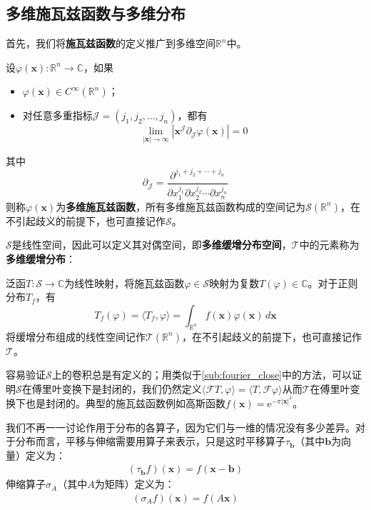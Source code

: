 \subsection{多维施瓦兹函数与多维分布}\label{sub:multi_schwartz}

首先，我们将\textbf{施瓦兹函数}的定义推广到多维空间$\mathbb{R}^n$中。
\begin{definition}[多维施瓦兹函数]
    设$\varphi(\mathbf{x}):\mathbb{R}^n\to\mathbb{C}$，如果\begin{itemize}
        \item $\varphi(\mathbf{x})\in C^{\infty}(\mathbb{R}^n)$；
        \item 对任意多重指标$\mathcal{J}=(j_1,j_2,\ldots,j_n)$，都有
        \[\lim_{|\mathbf{x}|\to\infty}|\mathbf{x}^{\mathcal{J}} \partial_{\mathcal{J}} \varphi(\mathbf{x})|=0\]
    \end{itemize}
    其中$$\partial_{\mathcal{J}}=\frac{\partial^{j_1+j_2+\cdots +j_n}}{\partial x_1^{j_1}\partial x_2^{j_2}\cdots \partial x_n^{j_n}}$$
    则称$\varphi(\mathbf{x})$为\textbf{多维施瓦兹函数}，所有多维施瓦兹函数构成的空间记为$\mathcal{S}(\mathbb{R}^n)$，在不引起歧义的前提下，也可直接记作$\mathcal{S}$。
\end{definition}

$\mathcal{S} $是线性空间，因此可以定义其对偶空间，即\textbf{多维缓增分布空间}，$\mathcal{T} $中的元素称为\textbf{多维缓增分布}：
\begin{definition}[多维缓增分布]
    泛函$T:\mathcal{S} \to \mathbb{C}$为线性映射，将施瓦兹函数$\varphi\in \mathcal{S} $映射为复数$T(\varphi)\in \mathbb{C}$。对于正则分布$T_f$，有
    $$T_f(\varphi)=\langle T_f,\varphi\rangle=\int_{\mathbb{R}^n}f(\mathbf{x})\varphi(\mathbf{x})\,d\mathbf{x}$$
    将缓增分布组成的线性空间记作$\mathcal{T} (\mathbb{R}^n)$，在不引起歧义的前提下，也可直接记作$\mathcal{T} $。
\end{definition}

容易验证$\mathcal{S} $上的卷积总是有定义的；用类似于\ref{sub:fourier_close}中的方法，可以证明$\mathcal{S} $在傅里叶变换下是封闭的，我们仍然定义$\langle \mathcal{F} T,\varphi\rangle=\langle T,\mathcal{F} \varphi\rangle$从而$\mathcal{T} $在傅里叶变换下也是封闭的。典型的施瓦兹函数例如高斯函数$f(\mathbf{x})=\mathrm{e}^{-\pi |\mathbf{x}|^2}$。

我们不再一一讨论作用于分布的各算子，因为它们与一维的情况没有多少差异。对于分布而言，平移与伸缩需要用算子来表示，只是这时平移算子$\tau_{\mathbf{b}}$（其中$\mathbf{b}$为向量）定义为：
\begin{align*}
    (\tau_{\mathbf{b}} f)(\mathbf{x})=f(\mathbf{x}-\mathbf{b})
\end{align*}
伸缩算子$\sigma_A$（其中$A$为矩阵）定义为：
\begin{align*}
    (\sigma_A f)(\mathbf{x})=f(A\mathbf{x})
\end{align*}

